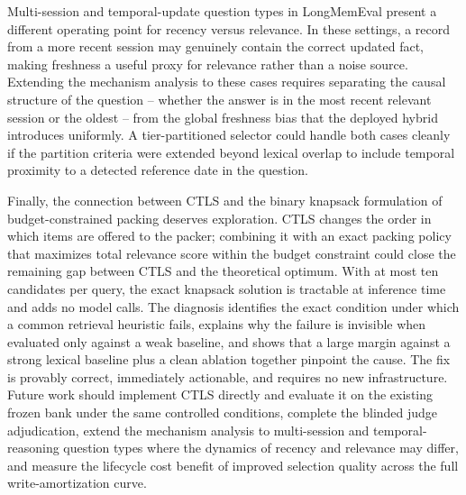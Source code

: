 Multi-session and temporal-update question types in LongMemEval present a different operating point for recency versus relevance. In these settings, a record from a more recent session may genuinely contain the correct updated fact, making freshness a useful proxy for relevance rather than a noise source. Extending the mechanism analysis to these cases requires separating the causal structure of the question -- whether the answer is in the most recent relevant session or the oldest -- from the global freshness bias that the deployed hybrid introduces uniformly. A tier-partitioned selector could handle both cases cleanly if the partition criteria were extended beyond lexical overlap to include temporal proximity to a detected reference date in the question.

Finally, the connection between CTLS and the binary knapsack formulation of budget-constrained packing deserves exploration. CTLS changes the order in which items are offered to the packer; combining it with an exact packing policy that maximizes total relevance score within the budget constraint could close the remaining gap between CTLS and the theoretical optimum. With at most ten candidates per query, the exact knapsack solution is tractable at inference time and adds no model calls.
 The diagnosis identifies the exact condition under which a common retrieval heuristic fails, explains why the failure is invisible when evaluated only against a weak baseline, and shows that a large margin against a strong lexical baseline plus a clean ablation together pinpoint the cause. The fix is provably correct, immediately actionable, and requires no new infrastructure. Future work should implement CTLS directly and evaluate it on the existing frozen bank under the same controlled conditions, complete the blinded judge adjudication, extend the mechanism analysis to multi-session and temporal-reasoning question types where the dynamics of recency and relevance may differ, and measure the lifecycle cost benefit of improved selection quality across the full write-amortization curve.


